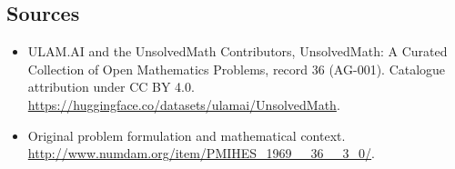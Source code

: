 \documentclass[11pt]{article}
\begin{document}
\subsection{Sources}
\begin{itemize}
\item[\hypertarget{source:36:1}{S1}] ULAM.AI and the UnsolvedMath Contributors, UnsolvedMath: A Curated Collection of Open Mathematics Problems, record 36 (AG-001). Catalogue attribution under CC BY 4.0.
\url{https://huggingface.co/datasets/ulamai/UnsolvedMath}.
\item[\hypertarget{source:36:2}{S2}] Original problem formulation and mathematical context.
\url{http://www.numdam.org/item/PMIHES_1969__36__3_0/}.
\end{itemize}
\label{end:36}
\end{document}
